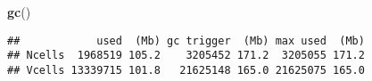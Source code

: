 \documentclass[11pt,]{article}
\newenvironment{Shaded}{\begin{snugshade}}{\end{snugshade}}
\newcommand{\KeywordTok}[1]{\textcolor[rgb]{0.13,0.29,0.53}{\textbf{#1}}}
\newcommand{\NormalTok}[1]{#1}
\begin{document}
\begin{Shaded}
\begin{Highlighting}[]
\KeywordTok{gc}\NormalTok{()}
\end{Highlighting}
\end{Shaded}

\begin{verbatim}
##            used  (Mb) gc trigger  (Mb) max used  (Mb)
## Ncells  1968519 105.2    3205452 171.2  3205055 171.2
## Vcells 13339715 101.8   21625148 165.0 21625075 165.0
\end{verbatim}




\newpage
\singlespacing 
\end{document}
